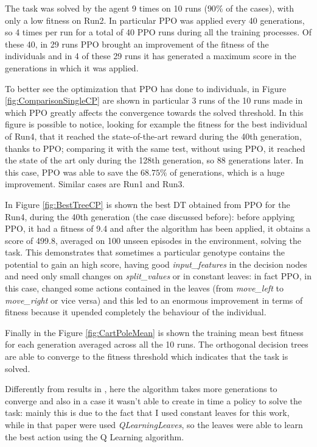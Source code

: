 The task was solved by the agent 9 times on 10 runs ($90\%$ of the cases), with only a low fitness on Run2. In particular PPO was applied every 40 generations, so 4 times per run for a total of 40 PPO runs during all the training processes. Of these 40, in 29 runs PPO brought an improvement of the fitness of the individuals and in 4 of these 29 runs it has generated a maximum score in the generations in which it was applied.

To better see the optimization that PPO has done to individuals, in Figure \ref{fig:ComparisonSingleCP} are shown in particular 3 runs of the 10 runs made in which PPO greatly affects the convergence towards the solved threshold. In this figure is possible to notice, looking for example the fitness for the best individual of Run4, that it reached the state-of-the-art reward during the 40th generation, thanks to PPO; comparing it with the same test, without using PPO, it reached the state of the art only during the 128th generation, so 88 generations later. In this case, PPO was able to save the $68.75\%$ of generations, which is a huge improvement. Similar cases are Run1 and Run3.

In Figure \ref{fig:BestTreeCP} is shown the best DT obtained from PPO for the Run4, during the 40th generation (the case discussed before): before applying PPO, it had a fitness of 9.4 and after the algorithm has been applied, it obtains a score of 499.8, averaged on 100 unseen episodes in the environment, solving the task. This demonstrates that sometimes a particular genotype contains the potential to gain an high score, having good \textit{input\_features} in the decision nodes and need only small changes on \textit{split\_values} or in constant leaves: in fact PPO, in this case, changed some actions contained in the leaves (from \textit{move\_left} to \textit{move\_right} or vice versa) and this led to an enormous improvement in terms of fitness because it upended completely the behaviour of the individual.

Finally in the Figure \ref{fig:CartPoleMean} is shown the training mean best fitness for each generation averaged across all the 10 runs. The orthogonal decision trees are able to converge to the fitness threshold which indicates that the task is solved.

Differently from results in \cite{custode}, here the algorithm takes more generations to converge and also in a case it wasn't able to create in time a policy to solve the task: mainly this is due to the fact that I used constant leaves for this work, while in that paper were used \textit{QLearningLeaves}, so the leaves were able to learn the best action using the Q Learning algorithm.

